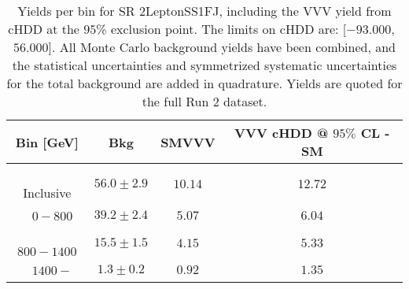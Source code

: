 \begin{table}[!htbp]
    \small
    \center
    \begin{tabular}{c||c|c|c}
    Bin [GeV] & Bkg & SMVVV & \pbox{20cm}{VVV \\ cHDD @ $95\%$ CL - SM \\ }\\
    \hline
    \pbox{20cm}{ ~ \\Inclusive\\ } & $56.0 \pm 2.9$ & $10.14$ & $12.72$\\
    \hline
    \pbox{20cm}{ ~ \\$0-800$\\ } & $39.2 \pm 2.4$ & $5.07$ & $6.04$\\
    \hline
    \pbox{20cm}{ ~ \\$800-1400$\\ } & $15.5 \pm 1.5$ & $4.15$ & $5.33$\\
    \hline
    \pbox{20cm}{ ~ \\$1400-$\\ } & $1.3 \pm 0.2$ & $0.92$ & $1.35$\\
\end{tabular}
    \caption{Yields per bin for SR 2LeptonSS1FJ, including the VVV yield from cHDD at the $95$\% exclusion point. The limits on cHDD are: [$-93.000$,~$56.000$]. All Monte Carlo background yields have been combined, and the statistical uncertainties and symmetrized systematic uncertainties for the total background are added in quadrature. Yields are quoted for the full Run 2 dataset.}
    \label{tab:2LeptonSS1FJ$binssignal}
\end{table}
